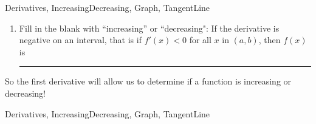\begin{tagblock}{Derivatives, IncreasingDecreasing, Graph, TangentLine}
\begin{question}
\begin{enumerate}
\item Fill in the blank with ``increasing'' or ``decreasing":  If the derivative is negative on an interval, that is if $f'(x) <0$ for all $x$ in $(a,b)$, then $f(x)$ is \rule{4cm}{0.1mm}




\end{enumerate}


\bigskip

So the first derivative will allow us to determine if a function is increasing or decreasing! 


	
\begin{tags}
	   Derivatives, IncreasingDecreasing, Graph, TangentLine
\end{tags}
	
\begin{diary}
\end{diary}
	
\begin{solution}
	   
\end{solution}
	
\end{question}

\end{tagblock}


